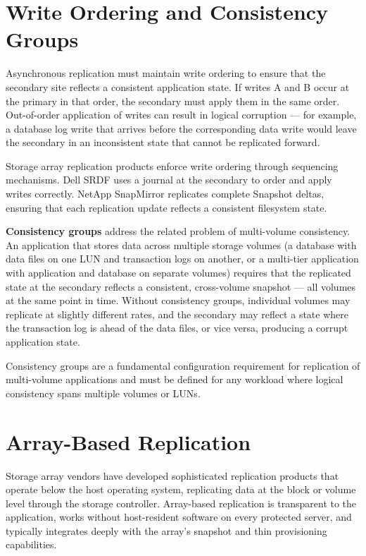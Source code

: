 \section{Write Ordering and Consistency Groups}
Asynchronous replication must maintain write ordering to ensure that the secondary site reflects a consistent application state. If writes A and B occur at the primary in that order, the secondary must apply them in the same order. Out-of-order application of writes can result in logical corruption --- for example, a database log write that arrives before the corresponding data write would leave the secondary in an inconsistent state that cannot be replicated forward.

Storage array replication products enforce write ordering through sequencing mechanisms. Dell SRDF uses a journal at the secondary to order and apply writes correctly. NetApp SnapMirror replicates complete Snapshot deltas, ensuring that each replication update reflects a consistent filesystem state.

\textbf{Consistency groups} address the related problem of multi-volume consistency. An application that stores data across multiple storage volumes (a database with data files on one LUN and transaction logs on another, or a multi-tier application with application and database on separate volumes) requires that the replicated state at the secondary reflects a consistent, cross-volume snapshot --- all volumes at the same point in time. Without consistency groups, individual volumes may replicate at slightly different rates, and the secondary may reflect a state where the transaction log is ahead of the data files, or vice versa, producing a corrupt application state.

Consistency groups are a fundamental configuration requirement for replication of multi-volume applications and must be defined for any workload where logical consistency spans multiple volumes or LUNs.

\section{Array-Based Replication}
Storage array vendors have developed sophisticated replication products that operate below the host operating system, replicating data at the block or volume level through the storage controller. Array-based replication is transparent to the application, works without host-resident software on every protected server, and typically integrates deeply with the array's snapshot and thin provisioning capabilities.

